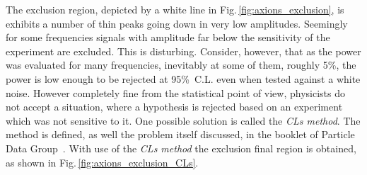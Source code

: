 The exclusion region, depicted by a white line in Fig.\,\ref{fig:axions_exclusion}, is exhibits a number of thin peaks going down in very low amplitudes. Seemingly for some frequencies signals with amplitude far below the sensitivity of the experiment are excluded. This is disturbing. Consider, however, that as the power was evaluated for many frequencies, inevitably at some of them, roughly 5\%, the power is low enough to be rejected at 95\%~C.L. even when tested against a white noise. However completely fine from the statistical point of view, physicists do not accept a situation, where a hypothesis is rejected based on an experiment which was not sensitive to it. One possible solution is called the \emph{CLs method}. The method is defined, as well the problem itself discussed, in the booklet of Particle Data Group~\citep{Group2014}. With use of the \emph{CLs method} the exclusion final region is obtained, as shown in Fig.\,\ref{fig:axions_exclusion_CLs}.
